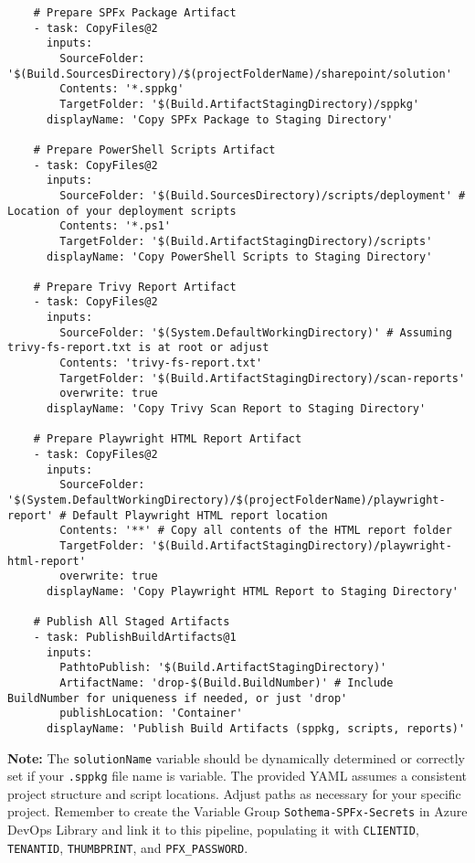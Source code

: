 \begin{verbatim}
    # Prepare SPFx Package Artifact
    - task: CopyFiles@2
      inputs:
        SourceFolder: '$(Build.SourcesDirectory)/$(projectFolderName)/sharepoint/solution'
        Contents: '*.sppkg'
        TargetFolder: '$(Build.ArtifactStagingDirectory)/sppkg'
      displayName: 'Copy SPFx Package to Staging Directory'

    # Prepare PowerShell Scripts Artifact
    - task: CopyFiles@2
      inputs:
        SourceFolder: '$(Build.SourcesDirectory)/scripts/deployment' # Location of your deployment scripts
        Contents: '*.ps1'
        TargetFolder: '$(Build.ArtifactStagingDirectory)/scripts'
      displayName: 'Copy PowerShell Scripts to Staging Directory'

    # Prepare Trivy Report Artifact
    - task: CopyFiles@2
      inputs:
        SourceFolder: '$(System.DefaultWorkingDirectory)' # Assuming trivy-fs-report.txt is at root or adjust
        Contents: 'trivy-fs-report.txt'
        TargetFolder: '$(Build.ArtifactStagingDirectory)/scan-reports'
        overwrite: true
      displayName: 'Copy Trivy Scan Report to Staging Directory'

    # Prepare Playwright HTML Report Artifact
    - task: CopyFiles@2
      inputs:
        SourceFolder: '$(System.DefaultWorkingDirectory)/$(projectFolderName)/playwright-report' # Default Playwright HTML report location
        Contents: '**' # Copy all contents of the HTML report folder
        TargetFolder: '$(Build.ArtifactStagingDirectory)/playwright-html-report'
        overwrite: true
      displayName: 'Copy Playwright HTML Report to Staging Directory'

    # Publish All Staged Artifacts
    - task: PublishBuildArtifacts@1
      inputs:
        PathtoPublish: '$(Build.ArtifactStagingDirectory)'
        ArtifactName: 'drop-$(Build.BuildNumber)' # Include BuildNumber for uniqueness if needed, or just 'drop'
        publishLocation: 'Container'
      displayName: 'Publish Build Artifacts (sppkg, scripts, reports)'
\end{verbatim}

\textbf{Note:} The \texttt{solutionName} variable should be dynamically determined or correctly set if your \texttt{.sppkg} file name is variable. The provided YAML assumes a consistent project structure and script locations. Adjust paths as necessary for your specific project. Remember to create the Variable Group \texttt{Sothema-SPFx-Secrets} in Azure DevOps Library and link it to this pipeline, populating it with \texttt{CLIENTID}, \texttt{TENANTID}, \texttt{THUMBPRINT}, and \texttt{PFX\_PASSWORD}.
